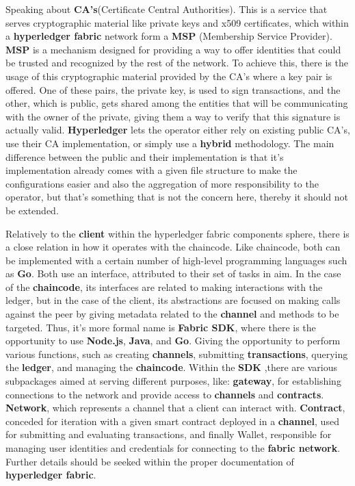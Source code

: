 Speaking about \textbf{CA's}(Certificate Central Authorities). This is a service that serves cryptographic material like private keys and x509 certificates, which within a \textbf{hyperledger fabric} network form a \textbf{MSP} (Membership Service Provider). \textbf{MSP} is a mechanism designed for providing a way to offer identities that could be trusted and recognized by the rest of the network. To achieve this, there is the usage of this cryptographic material provided by the CA's where a key pair is offered. One of these pairs, the private key, is used to sign transactions, and the other, which is public, gets shared among the entities that will be communicating with the owner of the private, giving them a way to verify that this signature is actually valid. \textbf{Hyperledger} lets the operator either rely on existing public CA's, use their CA implementation, or simply use a \textbf{hybrid} methodology. The main difference between the public and their implementation is that it's implementation already comes with a given file structure to make the configurations easier and also the aggregation of more responsibility to the operator, but that's something that is not the concern here, thereby it should not be extended.

Relatively to the \textbf{client} within the hyperledger fabric components sphere, there is a close relation in
how it operates with the chaincode. Like chaincode, both can be implemented with a certain number of
high-level programming languages such as \textbf{Go}. Both use an interface, attributed to their set of tasks in aim.
In the case of the \textbf{chaincode}, its interfaces are related to making interactions with the ledger, but in the case
of the client, its abstractions are focused on making calls against the peer by giving metadata related to
the \textbf{channel} and methods to be targeted. Thus, it’s more formal name is \textbf{Fabric SDK}, where there is the
opportunity to use \textbf{Node.js}, \textbf{Java}, and \textbf{Go}. Giving the opportunity to perform various functions, such as
creating \textbf{channels}, submitting \textbf{transactions}, querying the \textbf{ledger}, and managing the \textbf{chaincode}. Within
the \textbf{SDK} ,there are various subpackages aimed at serving different purposes, like: \textbf{gateway}, for establishing
connections to the network and provide access to \textbf{channels} and \textbf{contracts}. \textbf{Network}, which represents
a channel that a client can interact with. \textbf{Contract}, conceded for iteration with a given smart contract
deployed in a \textbf{channel}, used for submitting and evaluating transactions, and finally Wallet, responsible for
managing user identities and credentials for connecting to the \textbf{fabric network}. Further details should be
seeked within the proper documentation of \textbf{hyperledger fabric}.

